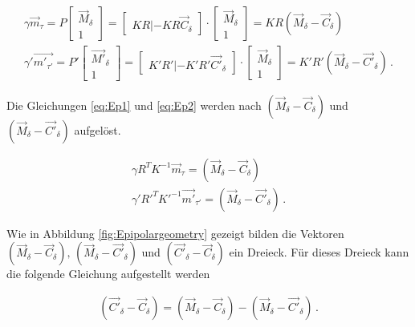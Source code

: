 \begin{gather}
	\gamma \overrightarrow{m}_\tau = P \begin{bmatrix}\overrightarrow{M}_\delta\\1\end{bmatrix} = 
	\begin{bmatrix}KR|-KR\overrightarrow{C}_\delta\end{bmatrix}\cdot \begin{bmatrix}\overrightarrow{M}_\delta\\1\end{bmatrix} = KR(\overrightarrow{M}_\delta - \overrightarrow{C}_\delta) \label{eq:Ep1} \\
	\gamma' \overrightarrow{m'_{\tau'}} = P' \begin{bmatrix}\overrightarrow{M'}_\delta\\1\end{bmatrix} = 
	\begin{bmatrix}K'R'|-K'R'\overrightarrow{C'}_\delta\end{bmatrix}\cdot \begin{bmatrix}\overrightarrow{M}_\delta\\1\end{bmatrix} = K'R'(\overrightarrow{M}_\delta - \overrightarrow{C'}_\delta)\label{eq:Ep2} \, .
\end{gather}


Die Gleichungen \ref{eq:Ep1} und \ref{eq:Ep2} werden nach $(\overrightarrow{M}_\delta-\overrightarrow{C}_\delta)$ und $(\overrightarrow{M}_\delta-\overrightarrow{C'}_\delta)$ aufgelöst.

\begin{gather}
	\gamma R^TK^{-1}\overrightarrow{m}_\tau = (\overrightarrow{M}_\delta-\overrightarrow{C}_\delta)\label{eq:Ep3}\\
	\gamma' R'^TK'^{-1}\overrightarrow{m'}_{\tau'} = (\overrightarrow{M}_\delta-\overrightarrow{C'}_\delta) \, .\label{eq:Ep4}
\end{gather}


Wie in Abbildung \ref{fig:Epipolargeometry} gezeigt bilden die Vektoren $(\overrightarrow{M}_\delta - \overrightarrow{C}_\delta),\, (\overrightarrow{M}_\delta - \overrightarrow{C'}_\delta)$ und $(\overrightarrow{C'}_\delta - \overrightarrow{C}_\delta)$ ein Dreieck. Für dieses Dreieck kann die folgende Gleichung aufgestellt werden

\begin{gather}
	(\overrightarrow{C'}_\delta - \overrightarrow{C}_\delta) = (\overrightarrow{M}_\delta - \overrightarrow{C}_\delta) - (\overrightarrow{M}_\delta - \overrightarrow{C'}_\delta) \, .
\end{gather}

